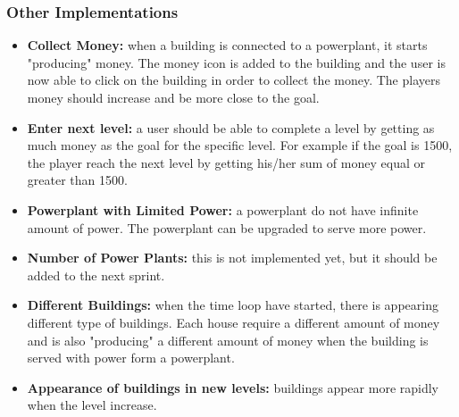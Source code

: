 	\subsubsection{Other Implementations}
		\begin{itemize}
			\item {\bf Collect Money: } when a building is connected to a powerplant, it starts
			"producing" money. The money icon is added to the building and the user is now
			able to click on the building in order to collect the money. The players money
			should increase and be more close to the goal. 
			\item {\bf Enter next level: } a user should be able to complete a level by getting
			as much money as the goal for the specific level. For example if the goal is 1500, the
			player reach the next level by getting his/her sum of money equal or greater than 1500.
			\item {\bf Powerplant with Limited Power: } a powerplant do not have infinite amount of
			power. The powerplant can be upgraded to serve more power. 
			\item {\bf Number of Power Plants: } this is not implemented yet, but it should be added
			to the next sprint. 
			\item {\bf Different Buildings: } when the time loop have started, there is appearing
			different type of buildings. Each house require a different amount of money and is
			also "producing" a different amount of money when the building is served with power
			form a powerplant. 
			\item {\bf Appearance of buildings in new levels: } buildings appear more rapidly 
			when the level increase. 
		\end{itemize}
	
